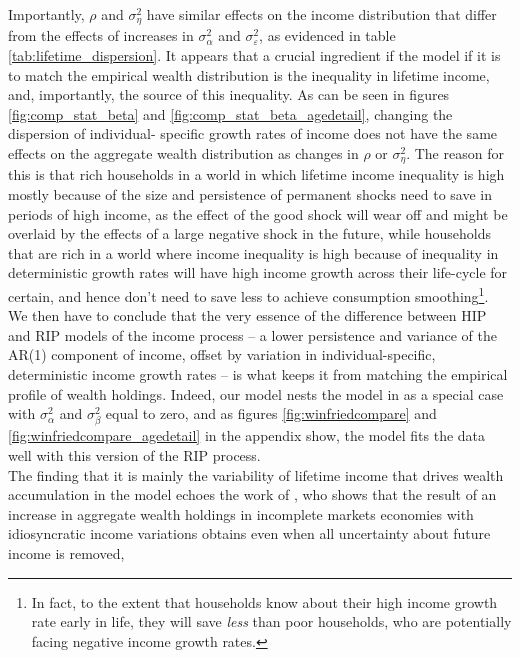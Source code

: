 Importantly, $\rho$ and $\sigma^2_{\eta}$ have similar effects on the income 
distribution that differ from the effects of increases in $\sigma^2_{\alpha}$ and
$\sigma^2_{\varepsilon}$, as evidenced in table \ref{tab:lifetime_dispersion}.
It appears that a crucial ingredient if the model if it is to match the empirical
wealth distribution is the inequality in lifetime income, and, importantly, the
source of this inequality. As can be seen in figures \ref{fig:comp_stat_beta} and
\ref{fig:comp_stat_beta_agedetail}, changing the dispersion of individual-
specific growth rates of income does not have the same effects on the 
aggregate wealth distribution as changes in $\rho$ or $\sigma^2_{\eta}$. The 
reason for this is that rich households in a world in which lifetime income 
inequality is high mostly because of the size and persistence of permanent shocks
need to save in periods of high income, as the effect of the good shock will wear
off and might be overlaid by the effects of a large negative shock in the future,
while households that are rich in a world where income inequality is high because
of inequality in deterministic growth rates will have high income growth across
their life-cycle for certain, and hence don't need to save less to achieve 
consumption smoothing\footnote{In fact, to the extent that households know about
their high income growth rate early in life, they will save \textit{less} than 
poor households, who are potentially facing negative income growth rates.}.
We then have to conclude that the very essence of the difference between HIP and
RIP models of the income process -- a lower persistence and variance of the AR(1)
component of income, offset by variation in individual-specific, deterministic
income growth rates -- is what keeps it from matching the empirical profile of
wealth holdings. Indeed, our model nests the model in \citet{HintermaierKoeniger2011}
as a special case with $\sigma^2_{\alpha}$ and $\sigma^2_{\beta}$ equal to zero,
and as figures \ref{fig:winfriedcompare} and \ref{fig:winfriedcompare_agedetail} in 
the appendix show, the model fits the data well with this version of the RIP 
process. \\
The finding that it is mainly the variability of lifetime income that drives
wealth accumulation in the model echoes the work of \citet{Floden2008}, who 
shows that the \citet{Aiyagari1994} result of an increase in aggregate wealth 
holdings in incomplete markets economies with idiosyncratic income variations
obtains even when all uncertainty about future income is removed, 

